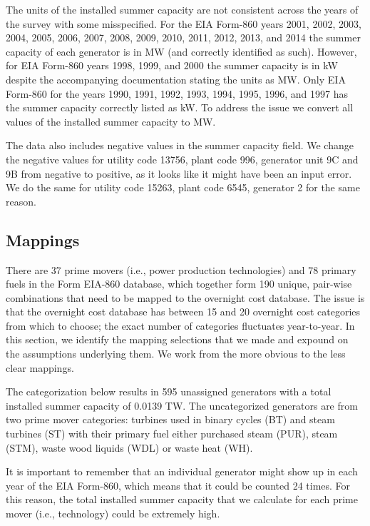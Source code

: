 \documentclass[10pt]{amsart}
\begin{document}
The units of the installed summer capacity are not consistent across the years of the survey with some misspecified. 
For the EIA Form-860 years 2001, 2002, 2003, 2004, 2005, 2006, 2007, 2008, 2009, 2010, 2011, 2012, 2013, and 2014 the summer capacity of each generator is in MW (and correctly identified as such). 
However, for EIA Form-860 years 1998, 1999, and 2000 the summer capacity is in kW despite the accompanying documentation stating the units as MW. 
Only EIA Form-860 for the years 1990, 1991, 1992, 1993, 1994, 1995, 1996, and 1997 has the summer capacity correctly listed as kW. 
To address the issue we convert all values of the installed summer capacity to MW.

The data also includes negative values in the summer capacity field. 
We change the negative values for utility code 13756, plant code 996, generator unit 9C and 9B from negative to positive, as it looks like it might have been an input error.
We do the same for utility code 15263, plant code 6545, generator 2 for the same reason.

\subsection{Mappings}
There are 37 prime movers (i.e., power production technologies) and 78 primary fuels in the Form EIA-860 database, which together form 190 unique, pair-wise combinations that need to be mapped to the overnight cost database. 
The issue is that the overnight cost database has between 15 and 20 overnight cost categories from which to choose; the exact number of categories fluctuates year-to-year.
In this section, we identify the mapping selections that we made and expound on the assumptions underlying them.
We work from the more obvious to the less clear mappings.

The categorization below results in 595 unassigned generators  with a total installed summer capacity of 0.0139 TW.
The uncategorized generators are from two prime mover categories: turbines used in binary cycles (BT) and steam turbines (ST) with their primary fuel either purchased steam (PUR), steam (STM), waste wood liquids (WDL) or waste heat (WH).

It is important to remember that an individual generator might show up in each year of the EIA Form-860, which means that it could be counted 24 times.
For this reason, the total installed summer capacity that we calculate for each prime mover (i.e., technology) could be extremely high. 
\end{document}
